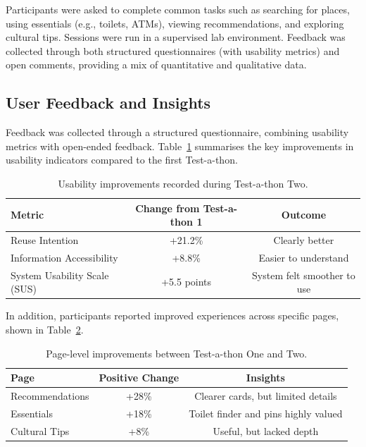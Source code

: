 Participants were asked to complete common tasks such as searching for places, using essentials (e.g., toilets, ATMs), 
viewing recommendations, and exploring cultural tips. Sessions were run in a supervised lab environment. 
Feedback was collected through both structured questionnaires (with usability metrics) and open comments, 
providing a mix of quantitative and qualitative data.

\subsection{User Feedback and Insights}
Feedback was collected through a structured questionnaire, combining usability metrics with open-ended feedback. Table~\ref{tab:usability-metrics} summarises the key improvements in usability indicators compared to the first Test-a-thon.

\begin{table}[H]
\centering
\small
\begin{tabular}{lcc}
\toprule
\textbf{Metric} & \textbf{Change from Test-a-thon 1} & \textbf{Outcome} \\
\midrule
Reuse Intention & +21.2\% & Clearly better \\
Information Accessibility & +8.8\% & Easier to understand \\
System Usability Scale (SUS) & +5.5 points & System felt smoother to use \\
\bottomrule
\end{tabular}
\caption{Usability improvements recorded during Test-a-thon Two.}
\label{tab:usability-metrics}
\end{table}

In addition, participants reported improved experiences across specific pages, shown in Table~\ref{tab:page-performance}.

\begin{table}[H]
\centering
\small
\begin{tabular}{lcc}
\toprule
\textbf{Page} & \textbf{Positive Change} & \textbf{Insights} \\
\midrule
Recommendations & +28\% & Clearer cards, but limited details \\
Essentials & +18\% & Toilet finder and pins highly valued \\
Cultural Tips & +8\% & Useful, but lacked depth \\
\bottomrule
\end{tabular}
\caption{Page-level improvements between Test-a-thon One and Two.}
\label{tab:page-performance}
\end{table}

